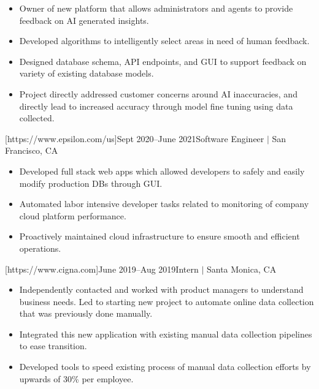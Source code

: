 \documentclass[letterpaper,11pt]{article}
\newcommand{\Item}[1]{
  \item\small{
    \parbox[t]{500pt}{\raggedright#1}
  }
}
\newenvironment{HeadingList}{
  \begin{mdframed}[
    topline=false,
    bottomline=false,
    rightline=false,
    leftline=false,
    linecolor=gray,
    linewidth=0pt,
    leftmargin=0pt,
    innerleftmargin=0pt,
    innertopmargin=0pt,
    innerbottommargin=0pt,
    innerrightmargin=0pt,
    skipabove=\parsep,
    skipbelow=\parsep,
  ]
  \begin{itemize}[leftmargin=0pt, label={}]
}{
  \end{itemize}
  \end{mdframed}
}
\newenvironment{SubHeadingList}{
  \begin{mdframed}[
    leftline=true,
    linecolor=gray,
    linewidth=.5pt,
    leftmargin=8pt,
    innerleftmargin=8pt,
  ]
  \begin{itemize}[leftmargin=0pt, label={}]
}{
  \end{itemize}
  \end{mdframed}
}
\newenvironment{ItemList}{
  \begin{itemize}[itemsep=4pt, topsep=-3pt, partopsep=0pt, parsep=0pt, leftmargin=20pt, label=\raisebox{0.4ex}{\scalebox{0.5}{\textbullet}}]
}{\end{itemize}}
\begin{document}
\begin{HeadingList}
\begin{SubHeadingList}
                \begin{ItemList}
                    \Item{Owner of new platform that allows administrators and agents to provide feedback on AI generated insights.}
                    \Item{Developed algorithms to intelligently select areas in need of human feedback.}
                    \Item{Designed database schema, API endpoints, and GUI to support feedback on variety of existing database models.}
                    \Item{Project directly addressed customer concerns around AI inaccuracies, and directly lead to increased accuracy through model fine tuning using data collected.}
                \end{ItemList}

            \end{SubHeadingList}


        [https://www.epsilon.com/us]{Sept 2020--June 2021}{Software Engineer $|$ San Francisco, CA}
            \begin{SubHeadingList}

                \begin{ItemList}
                    \Item{Developed full stack web apps which allowed developers to safely and easily modify production DBs through GUI.}
                    \Item{Automated labor intensive developer tasks related to monitoring of company cloud platform performance.}
                    \Item{Proactively maintained cloud infrastructure to ensure smooth and efficient operations.}
                \end{ItemList}

            \end{SubHeadingList}

        [https://www.cigna.com]{June 2019--Aug 2019}{Intern $|$ Santa Monica, CA}
            \begin{SubHeadingList}

                \begin{ItemList}
                    \Item{Independently contacted and worked with product managers to understand business needs. Led to starting new project to automate online data collection that was previously done manually.}
                    \Item{Integrated this new application with existing manual data collection pipelines to ease transition.}
                    \Item{Developed tools to speed existing process of manual data collection efforts by upwards of 30\% per employee.}
                \end{ItemList}

            \end{SubHeadingList}
    \end{HeadingList}
\end{document}

